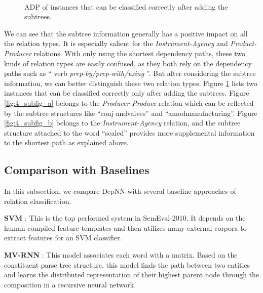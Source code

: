 \documentclass[11pt]{article}
\begin{document}
\begin{figure}[!htbp]
\centering
{}\\
\centering
{}
\caption{ADP of instances that can be classified correctly after adding the subtrees.}
\label{fig:4_fig}
\end{figure}
 We can see that the subtree information generally has a positive impact on all the relation types. It is especially salient for the \textit{Instrument-Agency} and  \textit{Product-Producer} relations.
 With only using the shortest dependency paths, these two kinds of relation types are easily confused, as they both rely on the dependency paths such as `` verb \textit{prep-by/prep-with/using }''.
But after considering the subtree information, we can better distinguish these two relation types. Figure \ref{fig:4_fig} lists two  instances that can be classified correctly only after adding the subtrees.  Figure \ref{fig:4_subfig_a} belongs to the \textit{Producer-Produce} relation which can be reflected by the subtree structures  like ``conj-andvalves'' and ``amodmanufacturing''.
Figure \ref{fig:4_subfig_b} belongs to the \textit{Instrument-Agency} relation, and the subtree structure attached to the word ``scaled'' provides more supplemental information to the shortest path as explained above.








\subsection{Comparison with Baselines}
In this subsection, we compare DepNN with several baseline approaches of relation classification.

{\bf SVM} \cite{UTD2010SemEval}:
This is the top performed system in SemEval-2010. It depends on the human compiled feature templates and then utilizes
many external corpora to extract features for an SVM classifier.



{\bf MV-RNN} \cite{socher2012emnlp}:
This model associates each word with a matrix. Based on the constituent parse tree structure, this model finds the path between two entities and learns the distributed representation of their highest parent node through the composition in a recursive neural network.
\end{document}
